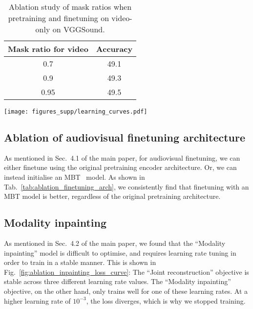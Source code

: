 \documentclass[10pt,twocolumn,letterpaper]{article}
\begin{document}
\begin{table}[tb] 
	\caption{Ablation study of mask ratios when pretraining and finetuning on video-only on VGGSound. 
}
	\vspace{-0.6\baselineskip}
	\centering
		\begin{tabular}{cc}
			\toprule 
			Mask ratio for video &  Accuracy \\
			\midrule
			0.7          & 49.1  \\ 0.9          & 49.3   \\ 0.95         & 49.5 \\ \bottomrule
		\end{tabular}
		\label{tab:ablation_study_mask_ratio_video}
\end{table}  \begin{figure*}[t]
    \centering
    \vspace{-\baselineskip}
    \texttt{[image: figures\_supp/learning\_curves.pdf]} 
    \vspace{-0.7\baselineskip}
    \caption{Learning curves for the ``Joint Reconstruction'' and ``Modality Inpainting'' objectives. Observe how ``Joint Reconstruction'' is stable across a wide range of learning rates. ``Modality Inpainting'', on the other hand, only performs well for a learning rate of $1.6 \times 10^{-4}$, and is unstable at higher values.
    These pretraining experiments were performed on VGGSound for 400 epochs with a batch size of 512.}
	\vspace{-\baselineskip}
    \label{fig:ablation_inpainting_loss_curve} \end{figure*} 
\subsection{Ablation of audiovisual finetuning architecture}

As mentioned in Sec.~4.1 of the main paper, for audiovisual finetuning, we can either finetune using the original pretraining encoder architecture.
Or, we can instead initialise an MBT~\cite{nagrani2021attention} model.
As shown in Tab.~\ref{tab:ablation_finetuning_arch}, we consistently find that finetuning with an MBT model is better, regardless of the original pretraining architecture.

\subsection{Modality inpainting}

As mentioned in Sec.~4.2 of the main paper, we found that the ``Modality inpainting'' model is difficult to optimise, and requires learning rate tuning in order to train in a stable manner.
This is shown in Fig.~\ref{fig:ablation_inpainting_loss_curve}: The ``Joint reconstruction'' objective is stable across three different learning rate values.
The ``Modality inpainting'' objective, on the other hand, only trains well for one of these learning rates. 
At a higher learning rate of $10^{-3}$, the loss diverges, which is why we stopped training.
\end{document}
